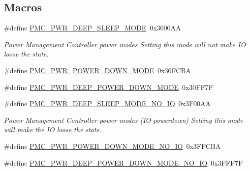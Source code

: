 \subsection*{Macros}
\begin{DoxyCompactItemize}
\item 
\#define \hyperlink{group___p_m_c__18_x_x__43_x_x_gaca8a69edb54ddb4cb539fda3f7c123a9}{P\+M\+C\+\_\+\+P\+W\+R\+\_\+\+D\+E\+E\+P\+\_\+\+S\+L\+E\+E\+P\+\_\+\+M\+O\+DE}~0x3000\+AA
\begin{DoxyCompactList}\small\item\em Power Management Controller power modes Setting this mode will not make IO loose the state. \end{DoxyCompactList}\item 
\#define \hyperlink{group___p_m_c__18_x_x__43_x_x_ga488f9a7733cd97457b4656670c7e932b}{P\+M\+C\+\_\+\+P\+W\+R\+\_\+\+P\+O\+W\+E\+R\+\_\+\+D\+O\+W\+N\+\_\+\+M\+O\+DE}~0x30\+F\+C\+BA
\item 
\#define \hyperlink{group___p_m_c__18_x_x__43_x_x_gad8936084d3b16e9bcd783586fc29ee15}{P\+M\+C\+\_\+\+P\+W\+R\+\_\+\+D\+E\+E\+P\+\_\+\+P\+O\+W\+E\+R\+\_\+\+D\+O\+W\+N\+\_\+\+M\+O\+DE}~0x30\+F\+F7F
\item 
\#define \hyperlink{group___p_m_c__18_x_x__43_x_x_ga3696589b9d3f6ab6bb5bee7e44fcde76}{P\+M\+C\+\_\+\+P\+W\+R\+\_\+\+D\+E\+E\+P\+\_\+\+S\+L\+E\+E\+P\+\_\+\+M\+O\+D\+E\+\_\+\+N\+O\+\_\+\+IO}~0x3\+F00\+AA
\begin{DoxyCompactList}\small\item\em Power Management Controller power modes (IO powerdown) Setting this mode will make the IO loose the state. \end{DoxyCompactList}\item 
\#define \hyperlink{group___p_m_c__18_x_x__43_x_x_ga50fdb688d7fbcdad20437595b897973b}{P\+M\+C\+\_\+\+P\+W\+R\+\_\+\+P\+O\+W\+E\+R\+\_\+\+D\+O\+W\+N\+\_\+\+M\+O\+D\+E\+\_\+\+N\+O\+\_\+\+IO}~0x3\+F\+F\+C\+BA
\item 
\#define \hyperlink{group___p_m_c__18_x_x__43_x_x_ga7136b2163bb95b08d538817081f7dd49}{P\+M\+C\+\_\+\+P\+W\+R\+\_\+\+D\+E\+E\+P\+\_\+\+P\+O\+W\+E\+R\+\_\+\+D\+O\+W\+N\+\_\+\+M\+O\+D\+E\+\_\+\+N\+O\+\_\+\+IO}~0x3\+F\+F\+F7F
\end{DoxyCompactItemize}

